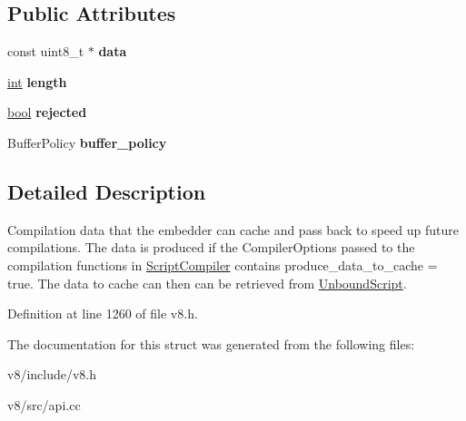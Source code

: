 \subsection*{Public Attributes}
\begin{DoxyCompactItemize}
\item 
\mbox{\label{structv8_1_1ScriptCompiler_1_1CachedData_a31e313a969170116f98d5a76c110fe61}} 
const uint8\+\_\+t $\ast$ {\bfseries data}
\item 
\mbox{\label{structv8_1_1ScriptCompiler_1_1CachedData_ad7b8b1b672095a2c33621d3d5b5c7f8f}} 
\mbox{\hyperlink{classint}{int}} {\bfseries length}
\item 
\mbox{\label{structv8_1_1ScriptCompiler_1_1CachedData_aa1d16fbd48957df19d4cc1c886afff8f}} 
\mbox{\hyperlink{classbool}{bool}} {\bfseries rejected}
\item 
\mbox{\label{structv8_1_1ScriptCompiler_1_1CachedData_a1e5c9ff625ac790139aec4294493fe32}} 
Buffer\+Policy {\bfseries buffer\+\_\+policy}
\end{DoxyCompactItemize}


\subsection{Detailed Description}
Compilation data that the embedder can cache and pass back to speed up future compilations. The data is produced if the Compiler\+Options passed to the compilation functions in \mbox{\hyperlink{classv8_1_1ScriptCompiler}{Script\+Compiler}} contains produce\+\_\+data\+\_\+to\+\_\+cache = true. The data to cache can then can be retrieved from \mbox{\hyperlink{classv8_1_1UnboundScript}{Unbound\+Script}}. 

Definition at line 1260 of file v8.\+h.



The documentation for this struct was generated from the following files\+:\begin{DoxyCompactItemize}
\item 
v8/include/v8.\+h\item 
v8/src/api.\+cc\end{DoxyCompactItemize}
